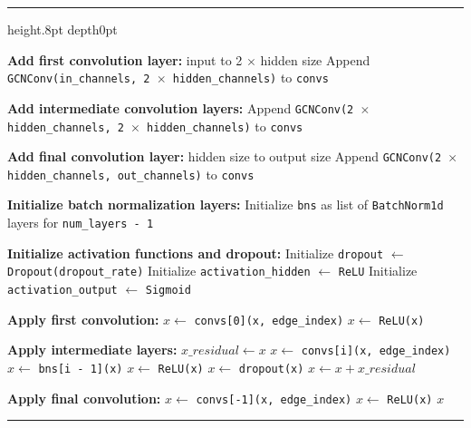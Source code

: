 \documentclass{article}
\makeatletter
\newenvironment{breakablealgorithm}
  {%
   \begin{center}
     \refstepcounter{algorithm}%
     \hrule height.8pt depth0pt \kern2pt%
     \renewcommand{\caption}[2][\relax]{%
       {\raggedright\textbf{\fname@algorithm~\thealgorithm} ##2\par}%
       \ifx\relax##1\relax %
         \addcontentsline{loa}{algorithm}{\protect\numberline{\thealgorithm}##2}%
       \else %
         \addcontentsline{loa}{algorithm}{\protect\numberline{\thealgorithm}##1}%
       \fi
       \kern2pt\hrule\kern2pt
     }
  }{%
     \kern2pt\hrule\relax%
   \end{center}
  }
\makeatother
\begin{document}
\begin{breakablealgorithm}
\begin{algorithmic}[1]
    \State \textbf{Add first convolution layer:} input to 2 $\times$ hidden size
    \State Append \texttt{GCNConv(in\_channels, 2 $\times$ hidden\_channels)} to \texttt{convs}
    
    \State \textbf{Add intermediate convolution layers:}
        \State Append \texttt{GCNConv(2 $\times$ hidden\_channels, 2 $\times$ hidden\_channels)} to \texttt{convs}
    \EndFor
    
    \State \textbf{Add final convolution layer:} hidden size to output size
    \State Append \texttt{GCNConv(2 $\times$ hidden\_channels, out\_channels)} to \texttt{convs}
    
    \State \textbf{Initialize batch normalization layers:}
    \State Initialize \texttt{bns} as list of \texttt{BatchNorm1d} layers for \texttt{num\_layers - 1}
    
    \State \textbf{Initialize activation functions and dropout:}
    \State Initialize \texttt{dropout} $\gets$ \texttt{Dropout(dropout\_rate)}
    \State Initialize \texttt{activation\_hidden} $\gets$ \texttt{ReLU}
    \State Initialize \texttt{activation\_output} $\gets$ \texttt{Sigmoid}
    
        \State \textbf{Apply first convolution:}
        \State $x \gets$ \texttt{convs[0](x, edge\_index)}
        \State $x \gets$ \texttt{ReLU(x)}
        
        \State \textbf{Apply intermediate layers:}
            \State $x\_residual \gets x$ 
            \State $x \gets$ \texttt{convs[i](x, edge\_index)}
            \State $x \gets$ \texttt{bns[i - 1](x)} 
            \State $x \gets$ \texttt{ReLU(x)}
            \State $x \gets$ \texttt{dropout(x)} 
            \State $x \gets x + x\_residual$ 
        \EndFor
        
        \State \textbf{Apply final convolution:}
        \State $x \gets$ \texttt{convs[-1](x, edge\_index)}
        \State $x \gets$ \texttt{ReLU(x)}
        \State \Return $x$
    \EndFunction
\EndProcedure
\end{algorithmic}
\end{breakablealgorithm}
\end{document}
